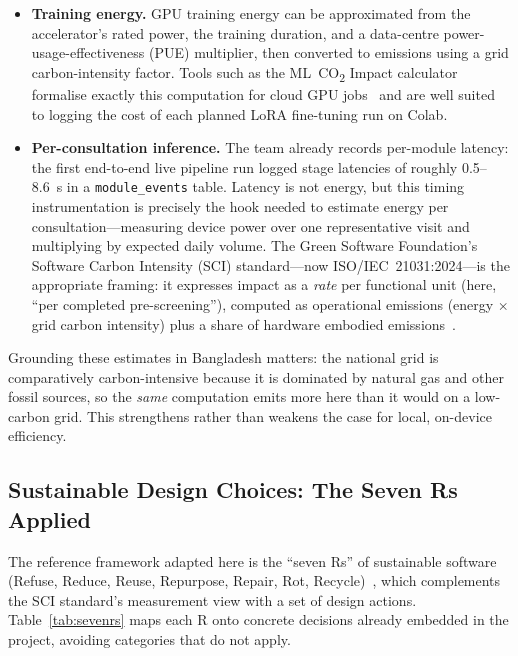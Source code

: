 \documentclass[11pt,a4paper]{article}
\begin{document}
\begin{itemize}
  \item \textbf{Training energy.} GPU training energy can be approximated from the
  accelerator's rated power, the training duration, and a data-centre
  power-usage-effectiveness (PUE) multiplier, then converted to emissions using a grid
  carbon-intensity factor. Tools such as the ML~CO\textsubscript{2} Impact calculator
  formalise exactly this computation for cloud GPU jobs~\cite{lacoste2019} and are well
  suited to logging the cost of each planned LoRA fine-tuning run on Colab.
  \item \textbf{Per-consultation inference.} The team already records per-module latency:
  the first end-to-end live pipeline run logged stage latencies of roughly 0.5--8.6~s in
  a \texttt{module\_events} table. Latency is not energy, but this timing instrumentation
  is precisely the hook needed to estimate energy per consultation---measuring device
  power over one representative visit and multiplying by expected daily volume. The Green
  Software Foundation's Software Carbon Intensity (SCI) standard---now
  ISO/IEC~21031:2024---is the appropriate framing: it expresses impact as a \emph{rate}
  per functional unit (here, ``per completed pre-screening''), computed as operational
  emissions (energy $\times$ grid carbon intensity) plus a share of hardware embodied
  emissions~\cite{sci2024}.
\end{itemize}

Grounding these estimates in Bangladesh matters: the national grid is comparatively
carbon-intensive because it is dominated by natural gas and other fossil sources, so the
\emph{same} computation emits more here than it would on a low-carbon grid. This
strengthens rather than weakens the case for local, on-device efficiency.

\subsection{Sustainable Design Choices: The Seven Rs Applied}
The reference framework adapted here is the ``seven Rs'' of sustainable software
(Refuse, Reduce, Reuse, Repurpose, Repair, Rot, Recycle)~\cite{accorinti2022}, which
complements the SCI standard's measurement view with a set of design actions.
Table~\ref{tab:sevenrs} maps each R onto concrete decisions already embedded in the
project, avoiding categories that do not apply.
\end{document}
